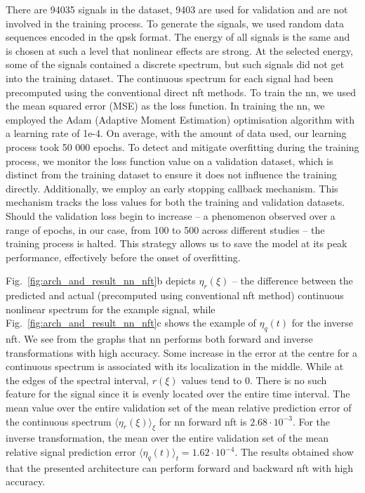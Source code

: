 There are 94035 signals in the dataset, 9403 are used for validation and are not involved in the training process. To generate the signals, we used random data sequences encoded in the \acrfull{qpsk} format. The energy of all signals is the same and is chosen at such a level that nonlinear effects are strong. At the selected energy, some of the signals contained a discrete spectrum, but such signals did not get into the training dataset. The continuous spectrum for each signal had been precomputed using the conventional direct \acrshort{nft} methods. To train the \acrshort{nn}, we used the mean squared error (MSE) as the loss function. In training the \acrshort{nn}, we employed the Adam (Adaptive Moment Estimation) optimisation algorithm with a learning rate of 1e-4. On average, with the amount of data used, our learning process took 50 000 epochs. To detect and mitigate overfitting during the training process, we monitor the loss function value on a validation dataset, which is distinct from the training dataset to ensure it does not influence the training directly. Additionally, we employ an early stopping callback mechanism. This mechanism tracks the loss values for both the training and validation datasets. Should the validation loss begin to increase -- a phenomenon observed over a range of epochs, in our case, from 100 to 500 across different studies -- the training process is halted. This strategy allows us to save the model at its peak performance, effectively before the onset of overfitting.

Fig.~\ref{fig:arch_and_result_nn_nft}b depicts $\eta_r(\xi)$ -- the difference between the predicted and actual (precomputed using conventional \acrshort{nft} method) continuous nonlinear spectrum for the example signal, while Fig.~\ref{fig:arch_and_result_nn_nft}c shows the example of $\eta_q(t)$ for the inverse \acrshort{nft}. We see from the graphs that \acrshort{nn} performs both forward and inverse transformations with high accuracy. Some increase in the error at the centre for a continuous spectrum is associated with its localization in the middle. While at the edges of the spectral interval, $r(\xi)$ values tend to $0$. There is no such feature for the signal since it is evenly located over the entire time interval.
The mean value over the entire validation set of the mean relative prediction error of the continuous spectrum $\langle \eta_r(\xi) \rangle_{\xi}$ for \acrshort{nn} forward \acrshort{nft} is $2.68 \cdot 10^{-3}$. For the inverse transformation, the mean over the entire validation set of the mean relative signal prediction error $\langle \eta_q(t) \rangle_{t} = 1.62 \cdot 10^{-4}$.
The results obtained show that the presented architecture can perform forward and backward \acrshort{nft} with high accuracy.



